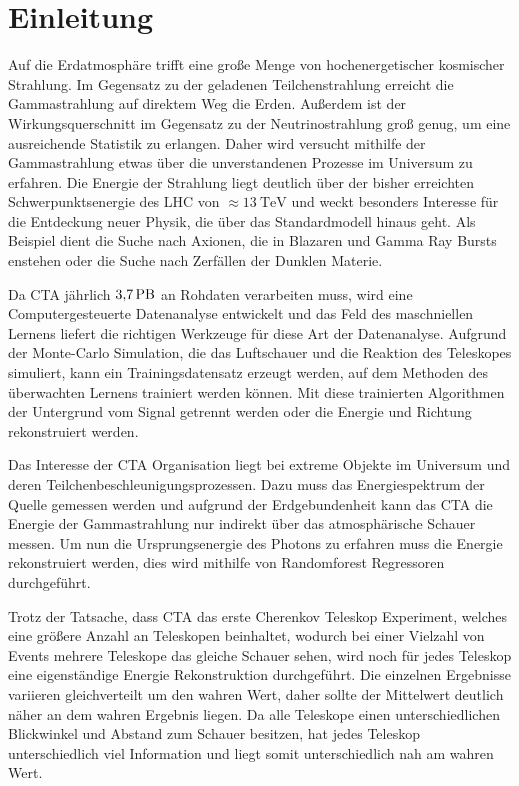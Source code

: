 \chapter{Einleitung}

Auf die Erdatmosphäre trifft eine große Menge von hochenergetischer kosmischer Strahlung.
Im Gegensatz zu der geladenen Teilchenstrahlung erreicht die Gammastrahlung auf direktem Weg die Erden.
Außerdem ist der Wirkungsquerschnitt im Gegensatz zu der Neutrinostrahlung groß genug, um eine ausreichende Statistik zu erlangen.
Daher wird versucht mithilfe der Gammastrahlung etwas über die unverstandenen Prozesse im Universum zu erfahren.
Die Energie der Strahlung liegt deutlich über der bisher erreichten Schwerpunktsenergie des LHC von $\approx\SI{13}{\tera\eV}$\cite{LHC} und weckt
besonders Interesse für die Entdeckung neuer Physik, die über das Standardmodell hinaus geht.
Als Beispiel dient die Suche nach Axionen, die in Blazaren und Gamma Ray Bursts enstehen oder die Suche nach Zerfällen der Dunklen Materie.

Da CTA jährlich $\SI{3.7}{\peta\byte}$\cite{Rohdaten} an Rohdaten verarbeiten muss, wird eine Computergesteuerte Datenanalyse
entwickelt und das Feld des maschniellen Lernens liefert die richtigen Werkzeuge für diese Art der Datenanalyse.
Aufgrund der Monte-Carlo Simulation, die das Luftschauer und die Reaktion des Teleskopes simuliert, kann ein Trainingsdatensatz erzeugt werden, auf dem
Methoden des überwachten Lernens trainiert werden können.
Mit diese trainierten Algorithmen der Untergrund vom Signal getrennt werden oder die Energie und Richtung rekonstruiert werden.

Das Interesse der CTA Organisation liegt bei extreme Objekte im Universum und deren Teilchenbeschleunigungsprozessen.
Dazu muss das Energiespektrum der Quelle gemessen werden und aufgrund der Erdgebundenheit kann das CTA die Energie der Gammastrahlung nur indirekt über
das atmosphärische Schauer messen.
Um nun die Ursprungsenergie des Photons zu erfahren muss die Energie rekonstruiert werden, dies wird mithilfe von Randomforest Regressoren durchgeführt.

Trotz der Tatsache, dass CTA das erste Cherenkov Teleskop Experiment, welches eine größere Anzahl an Teleskopen beinhaltet, wodurch bei einer Vielzahl von Events mehrere
Teleskope das gleiche Schauer sehen, wird noch für jedes Teleskop eine eigenständige Energie Rekonstruktion durchgeführt. Die einzelnen Ergebnisse variieren gleichverteilt
um den wahren Wert, daher sollte der Mittelwert deutlich näher an dem wahren Ergebnis liegen.
Da alle Teleskope einen unterschiedlichen Blickwinkel und Abstand zum Schauer besitzen, hat jedes Teleskop unterschiedlich viel Information und liegt somit
unterschiedlich nah am wahren Wert.

